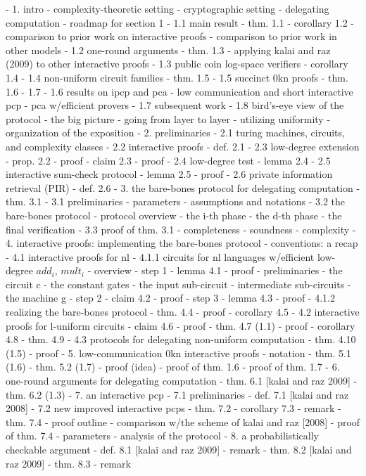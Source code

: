 \documentclass{article}
\begin{document}
- 1. intro
  - complexity-theoretic setting
  - cryptographic setting
  - delegating computation
  - roadmap for section 1
- 1.1 main result
  - thm. 1.1
  - corollary 1.2
  - comparison to prior work on interactive proofs
  - comparison to prior work in other models
- 1.2 one-round arguments
  - thm. 1.3
  - applying kalai and raz (2009) to other interactive proofs
- 1.3 public coin log-space verifiers
  - corollary 1.4
- 1.4 non-uniform circuit families
  - thm. 1.5
- 1.5 succinct 0kn proofs
  - thm. 1.6 - 1.7
- 1.6 results on ipcp and pca  - low communication and short interactive pcp
  - pca w/efficient provers
- 1.7 subsequent work
- 1.8 bird's-eye view of the protocol
  - the big picture
  - going from layer to layer
  - utilizing uniformity
  - organization of the exposition
- 2. preliminaries
- 2.1 turing machines, circuits, and complexity classes
- 2.2 interactive proofs
  - def. 2.1
- 2.3 low-degree extension
  - prop. 2.2
  - proof
  - claim 2.3
  - proof
- 2.4 low-degree test
  - lemma 2.4
- 2.5 interactive sum-check protocol
  - lemma 2.5
  - proof
- 2.6 private information retrieval (PIR)
  - def. 2.6
- 3. the bare-bones protocol for delegating computation
  - thm. 3.1
- 3.1 preliminaries
  - parameters
  - assumptions and notations
- 3.2 the bare-bones protocol
  - protocol overview
  - the i-th phase
  - the d-th phase
  - the final verification
- 3.3 proof of thm. 3.1
  - completeness
  - soundness
  - complexity
- 4. interactive proofs: implementing the bare-bones protocol
  - conventions: a recap
- 4.1 interactive proofs for nl
- 4.1.1 circuits for nl languages w/efficient low-degree $add_i$, $mult_i$
  - overview
  - step 1
    - lemma 4.1
    - proof
      - preliminaries
      - the circuit c
      - the constant gates
      - the input sub-circuit
      - intermediate sub-circuits
      - the machine g
  - step 2
    - claim 4.2
    - proof
  - step 3
    - lemma 4.3
    - proof
- 4.1.2 realizing the bare-bones protocol
  - thm. 4.4
  - proof
  - corollary 4.5
- 4.2 interactive proofs for l-uniform circuits
  - claim 4.6
  - proof
  - thm. 4.7 (1.1)
  - proof
  - corollary 4.8
  - thm. 4.9
- 4.3 protocols for delegating non-uniform computation
  - thm. 4.10 (1.5)
  - proof
- 5. low-communication 0kn interactive proofs
  - notation
  - thm. 5.1 (1.6)
  - thm. 5.2 (1.7)
  - proof (idea)
  - proof of thm. 1.6
  - proof of thm. 1.7
- 6. one-round arguments for delegating computation
  - thm. 6.1 [kalai and raz 2009]
  - thm. 6.2 (1.3)
- 7. an interactive pcp
- 7.1 preliminaries
  - def. 7.1 [kalai and raz 2008]
- 7.2 new improved interactive pcps
  - thm. 7.2
  - corollary 7.3
  - remark
  - thm. 7.4
  - proof outline
  - comparison w/the scheme of kalai and raz [2008]
  - proof of thm. 7.4
    - parameters
    - analysis of the protocol
- 8. a probabilistically checkable argument
  - def. 8.1 [kalai and raz 2009]
  - remark
  - thm. 8.2 [kalai and raz 2009]
  - thm. 8.3
  - remark
\end{document}
